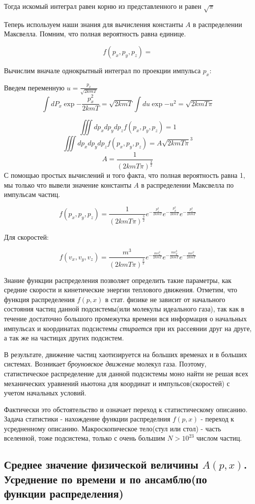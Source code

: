 \documentclass{article}
\begin{document}
Тогда искомый интеграл равен корню из представленного и равен $\sqrt{\pi}$

Теперь используем наши знания для вычисления константы $A$ в распределении Максвелла. Помним, что полная вероятность равна единице.

$$f(p_x, p_y, p_z) = $$

Вычислим вначале однокрытный интеграл по проекции импульса $p_x$:

Введем переменную $u = \frac{p_x}{\sqrt{2kmT}}$
$$\int dP_x \exp{-\frac{p_x^2}{2kmT}} = \sqrt{2kmT}\int du\exp{-u^2} = \sqrt{2kmT\pi}$$

$$\iiint dp_xdp_ydp_zf(p_x,p_y,p_z) = 1$$
$$\iiint dp_xdp_ydp_zf(p_x,p_y,p_z) = A\sqrt{2kmT\pi}^3$$
$$A = \frac{1}{(2kmT\pi)^{\frac32}}$$
С помощью простых вычислений и того факта, что полная вероятность равна 1, мы только что вывели значение константы $A$ в распределении Максвелла по импульсам частиц.

$$f(p_x, p_y, p_z) = \frac1{(2kmT\pi)^{\frac32}}e^{-\frac{p_x^2}{2kmT}}e^{-\frac{p_y^2}{2kmT}}e^{-\frac{p_z^2}{2kmT}}$$


Для скоростей: 

$$f(v_x, v_y, v_z) = \frac{m^3}{(2kmT\pi)^{\frac32}}e^{-\frac{mv^2_x}{2kmT}}e^{-\frac{mv_y^2}{2kmT}}e^{-\frac{mv_z^2}{2kmT}}$$

Знание функции распределения позволяет определить такие параметры, как средние скорости и кинетические энергии теплового движения. Отметим, что функция распределения $f(p,x)$ в стат. физике не зависит от начального состояния частиц данной подсистемы(или молекулы идеального газа), так как в течение достаточно большого промежутка времени вся информация о начальных импульсах и координатах подсистемы \emph{стирается} при их рассеянии друг на друге, а так же на частицах других подсистем.

В результате, движение частиц хаотизируется на больших временах и в больших системах. Возникает \emph{броуновское движение} молекул газа. Поэтому, статистическое распределение для данной подсистемы моно найти не решая всех механических уравнений ньютона для координат и импульсов(скоростей) с учетом начальных условий.

Фактически это обстоятельство и означает переход к статистическому описанию. Задача статистики - нахождение функции распределния $f(p, x)$ - переход к усредненному описанию. Макроскопическое тело(стул или стол) - часть вселенной, тоже подсистема, только с очень большим $N>10^{23}$ числом частиц. 

\subsection{Среднее значение физической величины $A(p,x)$. Усреднение по времени и по ансамблю(по функции распределения)}
\end{document}
